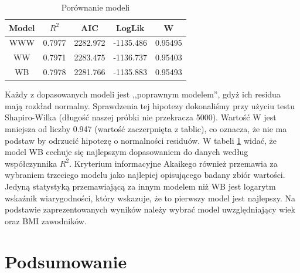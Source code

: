 \documentclass[11pt,a4paper]{article}
\begin{document}
\begin{table}[H]
	\begin{center}
		\begin{tabular}{| c | c | c | c | c |}
			\hline
			Model & $R^2$ & AIC & LogLik & W\\ \hline
			WWW & 0.7977 & 2282.972 & -1135.486 & 0.95495\\ \hline
			WW & 0.7971 & 2283.475 & -1136.737 & 0.95403\\ \hline 
			WB & 0.7978 & 2281.766 & -1135.883 & 0.95493\\ \hline  
		\end{tabular}
		\caption{Porównanie modeli}
		\label{porownanie_modeli_w}
	\end{center}
\end{table}
Każdy z dopasowanych modeli jest ,,poprawnym modelem'', gdyż ich residua mają rozkład normalny. Sprawdzenia tej hipotezy dokonaliśmy przy użyciu testu Shapiro-Wilka (długość naszej próbki nie przekracza 5000). Wartość W jest mniejsza od liczby 0.947 (wartość zaczerpnięta z tablic), co oznacza, że nie ma podstaw by odrzucić hipotezę o normalności residuów. W tabeli \ref{porownanie_modeli_w} widać, że model WB cechuje się najlepszym dopasowaniem do danych według współczynnika $R^2$. Kryterium informacyjne Akaikego również przemawia za wybraniem trzeciego modelu jako najlepiej opisującego badany zbiór wartości. Jedyną statystyką przemawiającą za innym modelem niż WB jest logarytm wskaźnik wiarygodności, który wskazuje, że to pierwszy model jest najlepszy. Na podstawie zaprezentowanych wyników należy wybrać model uwzględniający wiek oraz BMI zawodników.


\section{Podsumowanie}
\end{document}
